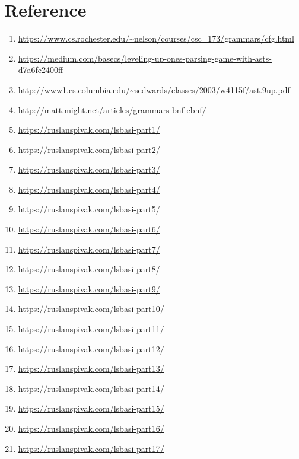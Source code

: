 \documentclass[14pt]{article}
\begin{document}
\section{Reference}
\begin{enumerate}
\item\url{https://www.cs.rochester.edu/~nelson/courses/csc_173/grammars/cfg.html}
\item\url{https://medium.com/basecs/leveling-up-ones-parsing-game-with-asts-d7a6fc2400ff}
\item\url{http://www1.cs.columbia.edu/~sedwards/classes/2003/w4115f/ast.9up.pdf}
\item\url{http://matt.might.net/articles/grammars-bnf-ebnf/}
\item\url{https://ruslanspivak.com/lsbasi-part1/}
\item\url{https://ruslanspivak.com/lsbasi-part2/}
\item\url{https://ruslanspivak.com/lsbasi-part3/}
\item\url{https://ruslanspivak.com/lsbasi-part4/}
\item\url{https://ruslanspivak.com/lsbasi-part5/}
\item\url{https://ruslanspivak.com/lsbasi-part6/}
\item\url{https://ruslanspivak.com/lsbasi-part7/}
\item\url{https://ruslanspivak.com/lsbasi-part8/}
\item\url{https://ruslanspivak.com/lsbasi-part9/}
\item\url{https://ruslanspivak.com/lsbasi-part10/}
\item\url{https://ruslanspivak.com/lsbasi-part11/}
\item\url{https://ruslanspivak.com/lsbasi-part12/}
\item\url{https://ruslanspivak.com/lsbasi-part13/}
\item\url{https://ruslanspivak.com/lsbasi-part14/}
\item\url{https://ruslanspivak.com/lsbasi-part15/}
\item\url{https://ruslanspivak.com/lsbasi-part16/}
\item\url{https://ruslanspivak.com/lsbasi-part17/}
\end{enumerate}
\end{document}
